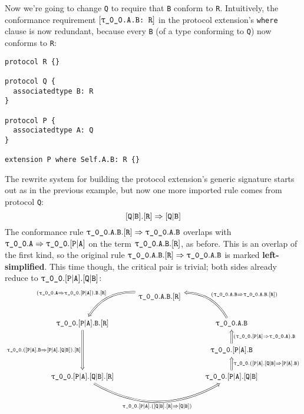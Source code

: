 \documentclass[../generics]{subfiles}
\begin{document}
\begin{example}
Now we're going to change \texttt{Q} to require that \texttt{B} conform to \texttt{R}. Intuitively, the conformance requirement $[\texttt{\texttt{$\uptau$\_0\_0}.A.B:~R}]$ in the protocol extension's \texttt{where} clause is now redundant, because every \texttt{B} (of a type conforming to \texttt{Q}) now conforms to \texttt{R}:
\begin{Verbatim}
protocol R {}

protocol Q {
  associatedtype B: R
}

protocol P {
  associatedtype A: Q
}

extension P where Self.A.B: R {}
\end{Verbatim}
The rewrite system for building the protocol extension's generic signature starts out as in the previous example, but now one more imported rule comes from protocol \texttt{Q}:
\[[\texttt{Q}|\texttt{B}].[\texttt{R}]\Rightarrow [\texttt{Q}|\texttt{B}]\]
The conformance rule $\texttt{$\uptau$\_0\_0}.\texttt{A}.\texttt{B}.[\texttt{R}]\Rightarrow \texttt{$\uptau$\_0\_0}.\texttt{A}.\texttt{B}$ overlaps with $\texttt{$\uptau$\_0\_0}.\texttt{A}\Rightarrow\texttt{$\uptau$\_0\_0}.[\texttt{P}|\texttt{A}]$ on the term $\texttt{$\uptau$\_0\_0}.\texttt{A}.\texttt{B}.[\texttt{R}]$, as before. This is an overlap of the first kind, so the original rule $\texttt{$\uptau$\_0\_0}.\texttt{A}.\texttt{B}.[\texttt{R}]\Rightarrow \texttt{$\uptau$\_0\_0}.\texttt{A}.\texttt{B}$ is marked \textbf{left-simplified}. This time though, the critical pair is trivial; both sides already reduce to $\texttt{$\uptau$\_0\_0}.[\texttt{P}|\texttt{A}].[\texttt{Q}|\texttt{B}]$:
\[
\begin{tikzcd}
&\ttgp{0}{0}.\texttt{A}.\texttt{B}.\protosym{R}
\arrow[ld, Rightarrow, bend right, "(\ttgp{0}{0}.\texttt{A}\Rightarrow\ttgp{0}{0}.\assocsym{P}{A}).\texttt{B}.\protosym{R}"']\\
\ttgp{0}{0}.\assocsym{P}{A}.\texttt{B}.\protosym{R}
\arrow[dd, Rightarrow, "\ttgp{0}{0}.(\assocsym{P}{A}.\texttt{B}\Rightarrow\assocsym{P}{A}.\assocsym{Q}{B}).\protosym{R}"']&&
\ttgp{0}{0}.\texttt{A}.\texttt{B}
\arrow[lu, Rightarrow, bend right, "(\ProtoConfInv{\ttgp{0}{0}.\texttt{A}.\texttt{B}}{R})"']
\\
&&
\ttgp{0}{0}.\assocsym{P}{A}.\texttt{B}
\arrow[u, Rightarrow, "(\ttgp{0}{0}.\assocsym{P}{A}\Rightarrow\ttgp{0}{0}.\texttt{A}).\texttt{B}"']
\\
\ttgp{0}{0}.\assocsym{P}{A}.\assocsym{Q}{B}.\protosym{R}
\arrow[rr, Rightarrow, bend right, "\ttgp{0}{0}.\assocsym{P}{A}.(\ProtoConf{\assocsym{Q}{B}}{R})"']
&&
\ttgp{0}{0}.\assocsym{P}{A}.\assocsym{Q}{B}
\arrow[u, Rightarrow, "\ttgp{0}{0}.(\assocsym{P}{A}.\assocsym{Q}{B}\Rightarrow\assocsym{P}{A}.\texttt{B})"']&&
\end{tikzcd}
\]
\end{example}
\end{document}
